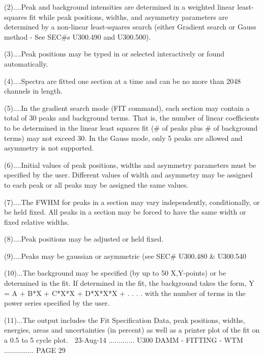    (2)....Peak  and background intensities are determined in a weighted linear
          least-squares  fit  while  peak  positions,  widths,  and  asymmetry
          parameters  are  determined  by  a  non-linear  least-squares search
          (either Gradient search or Gauss method -  See  SEC#s  U300.490  and
          U300.500).
 
   (3)....Peak  positions  may  be typed in or selected interactively or found
          automatically.
 
   (4)....Spectra are fitted one section at a time and can  be  no  more  than
          2048 channels in length.
 
   (5)....In  the gradient search mode (FIT command), each section may contain
          a total of 30 peaks and background terms. That  is,  the  number  of
          linear  coefficients  to  be  determined in the linear least squares
          fit (# of peaks plus # of background terms) may not  exceed  30.  In
          the  Gauss  mode,  only  5  peaks  are  allowed and asymmetry is not
          supported.
 
   (6)....Initial values of peak positions, widths  and  asymmetry  parameters
          must  be  specified  by  the  user.  Different  values  of width and
          asymmetry may be assigned to each peak or all peaks may be  assigned
          the same values.
 
   (7)....The  FWHM  for  peaks  in  a   section   may   vary   independently,
          conditionally,  or  be  held  fixed.  All  peaks in a section may be
          forced to have the same width or fixed relative widths.
 
   (8)....Peak positions may be adjusted or held fixed.
 
   (9)....Peaks may be gaussian or asymmetric (see SEC# U300.480 & U300.540
 
   (10)...The background may be specified (by  up  to  50  X,Y-points)  or  be
          determined  in  the  fit.  If  determined in the fit, the background
          takes the form, Y = A + B*X + C*X*X + D*X*X*X + . .  .  .  with  the
          number of terms in the power series specified by the user.
 
   (11)...The  output  includes  the  Fit  Specification Data, peak positions,
          widths, energies, areas and uncertainties (in percent) as well as  a
          printer plot of the fit on a 0.5 to 5 cycle plot.
    
   23-Aug-14 ............. U300  DAMM - FITTING - WTM ............... PAGE  29
 
